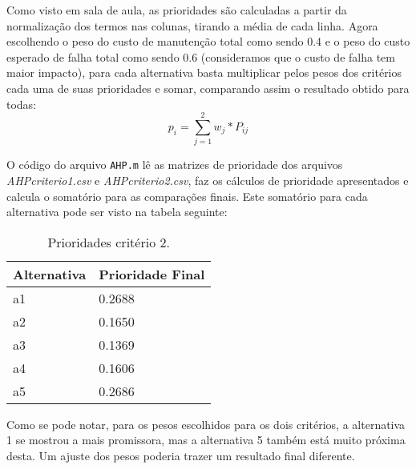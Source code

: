 Como visto em sala de aula, as prioridades são calculadas a partir da normalização dos termos nas colunas, tirando a média de cada linha. Agora escolhendo o peso do custo de manutenção total como sendo 0.4 e o peso do custo esperado de falha total como sendo 0.6 (consideramos que o custo de falha tem maior impacto), para cada alternativa basta multiplicar pelos pesos dos critérios cada uma de suas prioridades e somar, comparando assim o resultado obtido para todas:
\begin{equation}
p_i = \sum_{j=1}^{2} w_j*P_{ij}
\label{sum_cm}
\end{equation}

O código do arquivo \texttt{AHP.m} lê as matrizes de prioridade dos arquivos \textit{AHPcriterio1.csv} e \textit{AHPcriterio2.csv}, faz os cálculos de prioridade apresentados e calcula o somatório para as comparações finais. Este somatório para cada alternativa pode ser visto na tabela seguinte:
\begin{table}[h]
	\centering
	\begin{tabular}{ | l | l | }
		\hline
		Alternativa & Prioridade Final \\ \hline
		a1 & 0.2688 \\ \hline
		a2 & 0.1650 \\ \hline
		a3 & 0.1369 \\ \hline
		a4 & 0.1606 \\ \hline
		a5 & 0.2686 \\ \hline
	\end{tabular}
	\label{table:ahp-result}
	\caption{Prioridades critério 2.}
\end{table}

Como se pode notar, para os pesos escolhidos para os dois critérios, a alternativa 1 se mostrou a mais promissora, mas a alternativa 5 também está muito próxima desta. Um ajuste dos pesos poderia trazer um resultado final diferente.